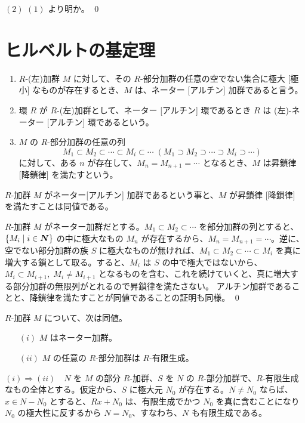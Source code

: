 $(2)$ $(1)$ より明か。
\qed

\newpage
\section{ヒルベルトの基定理}
\begin{definition}
\begin{enumerate}
\item $R$-(左)加群 $M$ に対して、その $R$-部分加群の任意の空でない集合に極大 [極小] なものが存在するとき、$M$ は、ネーター [アルチン] 加群であると言う。
\item 環 $R$ が $R$-(左)加群として、ネーター [アルチン] 環であるとき $R$ は (左)-ネーター [アルチン] 環であるという。
\item $M$ の $R$-部分加群の任意の列
$$M_1\subset M_2 \subset \cdots \subset M_i\subset \cdots\;(M_1\supset M_2 \supset \cdots \supset M_i\supset \cdots)$$
に対して、ある $n$ が存在して、$M_n = M_{n+1} = \cdots $ となるとき、$M$ は昇鎖律 [降鎖律] を満たすという。
\end{enumerate}
\end{definition}

\begin{prop} \label{prop:dcc:acc}
$R$-加群 $M$ がネーター{\rm [アルチン] }加群であるという事と、$M$ が昇鎖律 {\rm [降鎖律]} を満たすことは同値である。
\end{prop}
\proof
$R$-加群 $M$ がネーター加群だとする。$M_1\subset M_2\subset \cdots $ を部分加群の列とすると、$\{M_i\mid i\in\mbox{\boldmath $N$}\}$ の中に極大なもの $M_n$ が存在するから、$M_n = M_{n+1} = \cdots $。逆に、空でない部分加群の族 $S$ に極大なものが無ければ、$M_1\subset M_2\subset \cdots \subset M_i$ を真に増大する鎖として取る。すると、$M_i$ は $S$ の中で極大ではないから、$M_i\subset M_{i+1},\;M_i\neq M_{i+1}$ となるものを含む、これを続けていくと、真に増大する部分加群の無限列がとれるので昇鎖律を満たさない。
アルチン加群であることと、降鎖律を満たすことが同値であることの証明も同様。
\qed

\begin{prop} \label{prop:noether}
$R$-加群 $M$ について、次は同値。
\begin{itemize}
\item[$(i)$] $M$ はネーター加群。
\item[$(ii)$] $M$ の任意の $R$-部分加群は $R$-有限生成。
\end{itemize}
\end{prop}
\proof
$(i)\Rightarrow (ii)$　$N$ を $M$ の部分 $R$-加群、$S$ を $N$ の $R$-部分加群で、$R$-有限生成なもの全体とする。仮定から、$S$ に極大元 $N_0$ が存在する。$N\neq N_0$ ならば、$x\in N-N_0$ とすると、$Rx + N_0$ は、有限生成でかつ $N_0$ を真に含むことになり $N_0$ の極大性に反するから $N = N_0$、すなわち、$N$ も有限生成である。

